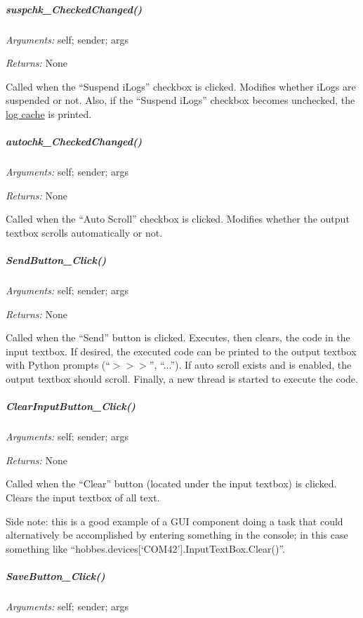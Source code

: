 \documentclass[12pt,letterpaper]{article}
\begin{document}
%
%
\subparagraph{suspchk\_CheckedChanged()}
\label{4.3.1.3.1}

\emph{Arguments:} self; sender; args

\emph{Returns:} None

Called when the ``Suspend iLogs'' checkbox is clicked. Modifies whether iLogs are suspended or not. Also, if the ``Suspend iLogs'' checkbox becomes unchecked, the \hyperref[4.3.2.2.23]{log cache} is printed.



%
%
\subparagraph{autochk\_CheckedChanged()}
\label{4.3.1.3.2}

\emph{Arguments:} self; sender; args

\emph{Returns:} None

Called when the ``Auto Scroll'' checkbox is clicked. Modifies whether the output textbox scrolls automatically or not.



%
%
\subparagraph{SendButton\_Click()}
\label{4.3.1.3.3}

\emph{Arguments:} self; sender; args

\emph{Returns:} None

Called when the ``Send'' button is clicked. Executes, then clears, the code in the input textbox. If desired, the executed code can be printed to the output textbox with Python prompts (``$>>>$'', ``...''). If auto scroll exists and is enabled, the output textbox should scroll. Finally, a new thread is started to execute the code.



%
%
\subparagraph{ClearInputButton\_Click()}
\label{4.3.1.3.4}

\emph{Arguments:} self; sender; args

\emph{Returns:} None

Called when the ``Clear'' button (located under the input textbox) is clicked. Clears the input textbox of all text.

Side note: this is a good example of a GUI component doing a task that could alternatively be accomplished by entering something in the console; in this case something like ``hobbes.devices[`COM42'].InputTextBox.Clear()''.



%
%
\subparagraph{SaveButton\_Click()}
\label{4.3.1.3.5}

\emph{Arguments:} self; sender; args
\end{document}

